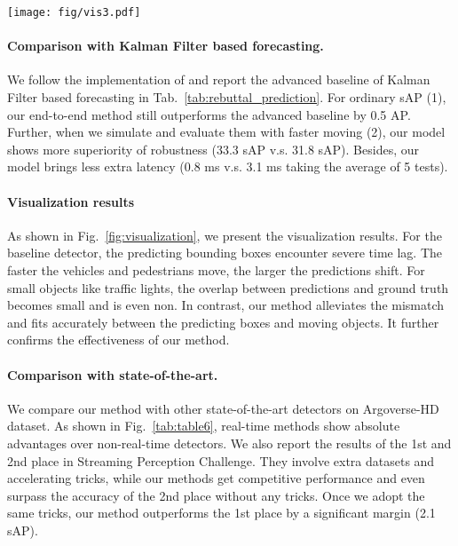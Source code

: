 \documentclass[10pt,twocolumn,letterpaper]{article}
\begin{document}
\begin{figure*}[t]
\setlength{\abovecaptionskip}{0pt}
\begin{center}
\texttt{[image: fig/vis3.pdf]}
\end{center}
\caption{Visualization results of the baseline detector and the proposed method. The green boxes represent ground truth boxes, while red ones represent prediction results.}
\vspace{-0.4cm}
\label{fig:visualization}
\end{figure*}

\paragraph{Comparison with Kalman Filter based forecasting.} We follow the implementation of \cite{streamer} and report the advanced baseline of Kalman Filter based forecasting in Tab.~\ref{tab:rebuttal_prediction}. For ordinary sAP (1), our end-to-end method still outperforms the advanced baseline by 0.5 AP. Further, when we simulate and evaluate them with faster moving (2), our model shows more superiority of robustness (33.3 sAP v.s. 31.8 sAP). Besides, our model brings less extra latency (0.8 ms v.s. 3.1 ms taking the average of 5 tests).


\paragraph{Visualization results}
As shown in Fig.~\ref{fig:visualization}, we present the visualization results. For the baseline detector, the predicting bounding boxes encounter severe time lag. The faster the vehicles and pedestrians move, the larger the predictions shift. For small objects like traffic lights, the overlap between predictions and ground truth becomes small and is even non. In contrast, our method alleviates the mismatch and fits accurately between the predicting boxes and moving objects. It further confirms the effectiveness of our method.

\paragraph{Comparison with state-of-the-art.}
We compare our method with other state-of-the-art detectors on Argoverse-HD dataset. As shown in Fig.~\ref{tab:table6}, real-time methods show absolute advantages over non-real-time detectors.
We also report the results of the 1st and 2nd place in Streaming Perception Challenge. They involve extra datasets and accelerating tricks, while our methods get competitive performance and even surpass the accuracy of the 2nd place without any tricks. Once we adopt the same tricks, our method outperforms the 1st place by a significant margin (2.1 sAP).
\end{document}
